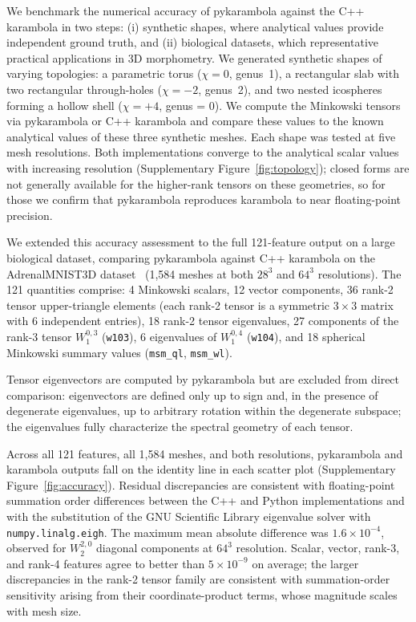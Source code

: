 \documentclass[times, twoside, watermark]{zHenriquesLab-StyleBioRxiv}
\newcommand{\newtxt}[1]{#1}
\newcommand{\added}[2][]{#2}        %
\newcommand{\replaced}[3][]{#2}     %
\newcommand{\newtxt}[1]{\textcolor{chgadded}{#1}}
\renewcommand{\added}[2][]{\newtxt{#2}}  %
\begin{document}
\added{We benchmark the numerical accuracy of pykarambola against the C++ karambola in two steps: (i) synthetic shapes, where analytical values provide independent ground truth, and (ii) biological datasets, which representative practical applications in 3D morphometry. 
We generated synthetic shapes of varying topologies: a parametric torus ($\chi = 0$, genus~1), a rectangular slab with two rectangular through-holes ($\chi = -2$, genus~2), and two nested icospheres forming a hollow shell ($\chi = +4$, genus = 0).
We compute the Minkowski tensors via pykarambola or C++ karambola and compare these values to the known analytical values of these three synthetic meshes.
Each shape was tested at five mesh resolutions.
Both implementations converge to the analytical scalar values with increasing resolution (Supplementary Figure~\ref{fig:topology}); closed forms are not generally available for the higher-rank tensors on these geometries, so for those we confirm that pykarambola reproduces karambola to near floating-point precision.}

\replaced{We extended this accuracy assessment to the full 121-feature output on a large biological dataset, comparing pykarambola against C++ karambola on the AdrenalMNIST3D }{To assess numerical accuracy, we compared all 121 output features of pykarambola against C++ karambola on the full AdrenalMNIST3D }
dataset~\cite{Yang2023MedMNIST} (1{,}584 meshes at both $28^3$ and $64^3$
resolutions).
The 121 quantities comprise: 4 Minkowski scalars, 12 vector components, 36
rank-2 tensor upper-triangle elements (each rank-2 tensor is a symmetric
$3\times 3$ matrix with 6 independent entries), 18 rank-2 tensor eigenvalues, 27
components of the rank-3 tensor $W_1^{0,3}$ (\texttt{w103}), 6 eigenvalues of
$W_1^{0,4}$ (\texttt{w104}), and 18 spherical Minkowski summary values
(\texttt{msm\_ql}, \texttt{msm\_wl}).

Tensor eigenvectors are computed by pykarambola but are excluded from 
direct comparison: eigenvectors are defined only up to sign and, in the presence 
of degenerate eigenvalues, up to arbitrary rotation within the degenerate 
subspace; the eigenvalues fully characterize the spectral geometry of each tensor.

Across all 121 features, all 1{,}584 meshes, and both resolutions,
pykarambola and karambola outputs fall on the identity line in
each scatter plot (Supplementary Figure~\ref{fig:accuracy}).
Residual discrepancies are consistent with floating-point summation order
differences between the C++ and Python implementations and with the substitution
of the GNU Scientific Library eigenvalue solver with \texttt{numpy.linalg.eigh}.
The maximum mean absolute difference was $1.6 \times 10^{-4}$, observed for
$W_2^{2,0}$ diagonal components at $64^3$ resolution.
Scalar, vector, rank-3, and rank-4 features agree to better than
$5 \times 10^{-9}$ on average; the larger discrepancies in the rank-2 tensor
family are consistent with summation-order sensitivity arising from their
coordinate-product terms, whose magnitude scales with mesh size.
\end{document}
